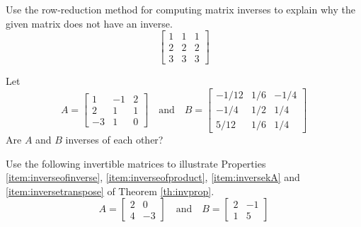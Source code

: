 \documentclass{ximera}
\begin{document}
\begin{problem}\label{prob:inverseofsingularmatrix}
Use the row-reduction method for computing matrix inverses to explain why the given matrix does not have an inverse.
$$\begin{bmatrix}1&1&1\\2&2&2\\3&3&3\end{bmatrix}$$
\end{problem}

\begin{problem}\label{prob:inversesofeachother} Let $$A=\begin{bmatrix}1&-1&2\\2&1&1\\-3&1&0\end{bmatrix}\quad\text{and}\quad B=\begin{bmatrix}-1/12&1/6&-1/4\\-1/4&1/2&1/4\\5/12&1/6&1/4\end{bmatrix}$$ Are $A$ and $B$ inverses of each other?

\begin{multipleChoice}
\end{multipleChoice}
\end{problem}





\begin{problem}\label{prob:illustratematinverse} Use the following invertible matrices to illustrate Properties \ref{item:inverseofinverse}, \ref{item:inverseofproduct}, \ref{item:inversekA} and \ref{item:inversetranspose} of Theorem \ref{th:invprop}.
$$A=\begin{bmatrix}2&0\\4&-3\end{bmatrix}\quad\text{and}\quad B=\begin{bmatrix}2&-1\\1&5\end{bmatrix}$$
\end{problem}
\end{document}
